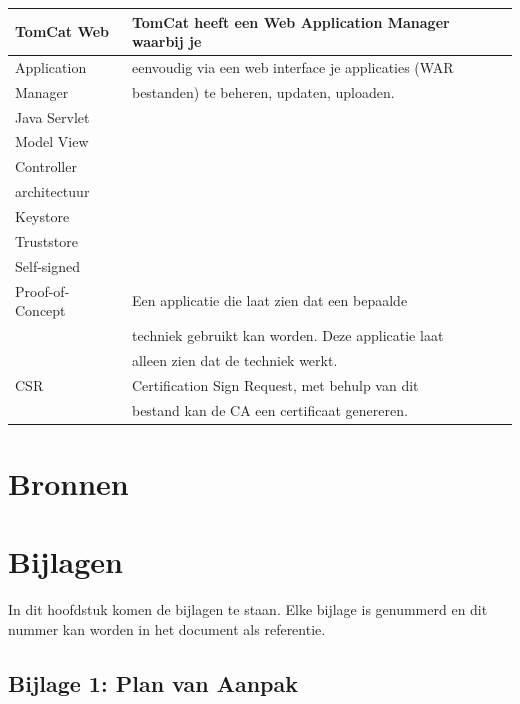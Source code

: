 \documentclass{article}
\begin{document}
\begin{tabular}{|| l | l ||}
    TomCat Web       & TomCat heeft een Web Application Manager waarbij je  \\\hline
    Application      & eenvoudig via een web interface je applicaties (WAR  \\\hline
    Manager          & bestanden) te beheren, updaten, uploaden.            \\\hline
    Java Servlet     &                                                      \\\hline
    Model View       &                                                      \\\hline
    Controller       &                                                      \\\hline
    architectuur     &                                                      \\\hline
    Keystore         &                                                      \\\hline
    Truststore       &                                                      \\\hline
    Self-signed      &                                                      \\\hline
    Proof-of-Concept & Een applicatie die laat zien dat een bepaalde        \\
                     & techniek gebruikt kan worden. Deze applicatie laat   \\
                     & alleen zien dat de techniek werkt.                   \\
    CSR              & Certification Sign Request, met behulp van dit       \\
                     & bestand kan de CA een certificaat genereren.         \\\hline
\end{tabular}

\newpage
\section{Bronnen}

\newpage
\section{Bijlagen}

In dit hoofdstuk komen de bijlagen te staan. Elke bijlage is genummerd en
dit nummer kan worden in het document als referentie.

\subsection{Bijlage 1: Plan van Aanpak}
\end{document}
